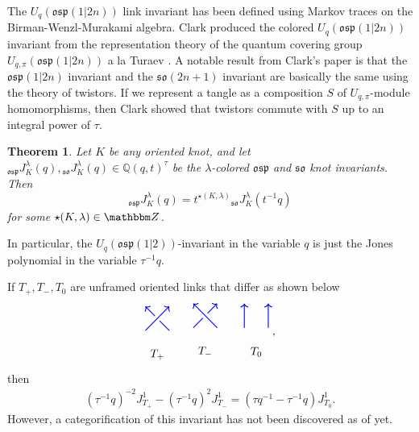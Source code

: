 \documentclass{amsart}
\newcommand{\hackcenter}[1]{
 \xy (0,0)*{#1}; \endxy}
\def\Q{\mathsf{Q}}
\theoremstyle{plain}
\newtheorem{theorem}{Theorem}
\theoremstyle{definition}
\theoremstyle{definition}
\numberwithin{equation}{section}
\numberwithin{theorem}{section}
\def\mf{\mathfrak}
\def\Q{\mathbb{Q}}
\numberwithin{equation}{section}
\def\Z{{\mathbbm Z}}
\begin{document}
The $U_{q}(\mf{osp}(1|2n))$ link invariant has been defined using Markov traces on the Birman-Wenzl-Murakami algebra\cite{Blu09}.
Clark \cite{C} produced the colored $U_q(\mf{osp}(1|2n))$ invariant from the representation theory of the quantum covering group $U_{q,\pi}(\mf{osp}(1|2n))$ a la Turaev \cite{Tu}.
A notable result from Clark's paper is that the $\mf{osp}(1|2n)$ invariant and the $\mf{so}(2n+1)$ invariant are basically the same using the theory of twistors.
If we represent a tangle as a composition $S$ of $U_{q,\pi}$-module homomorphisms, then Clark showed that twistors commute with $S$ up to an integral power of $\tau$.
\begin{theorem}{\cite[Theorem 4.24]{C}}
Let $K$ be any oriented knot, and let ${}_{\mf{osp}}J_K^\lambda(q), {}_{\mf{so}}J_K^\lambda(q)\in \Q(q,t)^\tau$ be the $\lambda$-colored $\mf{osp}$ and $\mf{so}$ knot invariants.
Then
  \[
  {}_{\mf{osp}}J_K^\lambda(q)=t^{\star(K,\lambda)}{}_{\mf{so}}J_K^\lambda(t^{-1}q)
  \]
  for some $\star(K,\lambda)\in \Z$.
\end{theorem}
In particular, the $U_q(\mf{osp}(1|2))$-invariant in the variable $q$ is just the Jones polynomial in the variable $\tau^{-1}q$.

If $T_+, T_-, T_0$ are unframed oriented links that differ as shown below
\begin{align*}
  \hackcenter{ \begin{tikzpicture} [scale=.75]
\draw[thick,   blue, ->] (0,0) to (1,1);
\draw[thick,   blue  ] (1,0) to (.6,.4);
\draw[thick,   blue, <-] (0,1) to (.4,.6);
 \node at (.5,-1) {$T_+$};
\end{tikzpicture}}
\qquad
  \hackcenter{ \begin{tikzpicture} [xscale=-1, scale=.75]
\draw[thick,   blue, ->] (0,0) to (1,1);
\draw[thick,   blue  ] (1,0) to (.6,.4);
\draw[thick,   blue, <-] (0,1) to (.4,.6);
 \node at (.5,-1) {$T_-$};
\end{tikzpicture}}
\qquad
  \hackcenter{ \begin{tikzpicture} [xscale=-1, scale=.75]
\draw[thick,   blue, ->] (0,0) to (0,1);
\draw[thick,   blue, ->] (1,0) to (1,1);
 \node at (.5,-1) {$T_0$};
\end{tikzpicture}},
\end{align*}
then
\begin{align}\label{osp-Skein}
  (\tau^{-1}q)^{-2} J_{T_+}^1-(\tau^{-1} q)^2 J_{T_-}^1=(\tau q^{-1}-\tau^{-1}q)J_{T_0}^1.
\end{align}
However, a categorification of this invariant has not been discovered as of yet.
\end{document}
